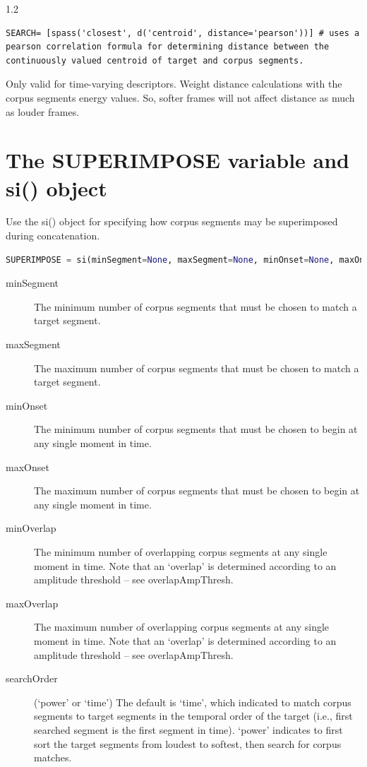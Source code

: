 \documentclass{article}
\begin{document}
\begin{spacing}{1.2}
\begin{description}
\begin{lstlisting}
SEARCH= [spass('closest', d('centroid', distance='pearson'))] # uses a pearson correlation formula for determining distance between the continuously valued centroid of target and corpus segments.
\end{lstlisting}

\item[energy] Only valid for time-varying descriptors.  Weight distance calculations with the corpus segments energy values.  So, softer frames will not affect distance as much as louder frames.
\end{description}


\section{The SUPERIMPOSE variable and si() object}
Use the si() object for specifying how corpus segments may be superimposed during concatenation.

 \begin{lstlisting}[language=python]
SUPERIMPOSE = si(minSegment=None, maxSegment=None, minOnset=None, maxOnset=8, minOverlap=None, maxOverlap=None, searchOrder='power', calcMethod='mixture', peakAlign=False)
\end{lstlisting}
 
\begin{description}

\item[minSegment] The minimum number of corpus segments that must be chosen to match a target segment.
\item[maxSegment] The maximum number of corpus segments that must be chosen to match a target segment.
\item[minOnset] The minimum number of corpus segments that must be chosen to begin at any single moment in time.
\item[maxOnset] The maximum number of corpus segments that must be chosen to begin at any single moment in time.
\item[minOverlap] The minimum number of overlapping corpus segments at any single moment in time.  Note that an `overlap' is determined according to an amplitude threshold -- see overlapAmpThresh.
\item[maxOverlap] The maximum number of overlapping corpus segments at any single moment in time.  Note that an `overlap' is determined according to an amplitude threshold -- see overlapAmpThresh.

\item[searchOrder] (`power' or `time')  The default is `time', which indicated to match corpus segments to target segments in the temporal order of the target (i.e., first searched segment is the first segment in time).  `power' indicates to first sort the target segments from loudest to softest, then search for corpus matches.


\end{description}
\end{spacing}
\end{document}

